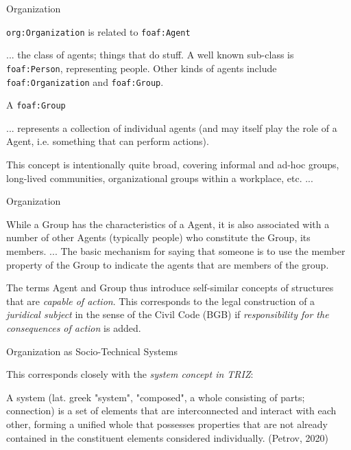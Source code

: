 \documentclass{beamer}
\begin{document}
\begin{frame}{Organization}

  \texttt{org:Organization} is related to \texttt{foaf:Agent}

  ... the class of agents; things that do stuff. A well known sub-class is
  \texttt{foaf:Person}, representing people. Other kinds of agents include
  \texttt{foaf:Organization} and \texttt{foaf:Group}. 

  A \texttt{foaf:Group}

  ... represents a collection of individual agents (and may itself play the
  role of a Agent, i.e. something that can perform actions).

  This concept is intentionally quite broad, covering informal and ad-hoc
  groups, long-lived communities, organizational groups within a workplace,
  etc. ...
\end{frame}

\begin{frame}{Organization}

  While a Group has the characteristics of a Agent, it is also associated with
  a number of other Agents (typically people) who constitute the Group, its
  members. ...  The basic mechanism for saying that someone is to use the
  member property of the Group to indicate the agents that are members of the
  group.
  
  The terms Agent and Group thus introduce self-similar concepts of structures
  that are \emph{capable of action}. This corresponds to the legal
  construction of a \emph{juridical subject} in the sense of the Civil Code
  (BGB) if \emph{responsibility for the consequences of action} is added.

\end{frame}

\begin{frame}{Organization as Socio-Technical Systems}

This corresponds closely with the \emph{system concept in TRIZ}:

  A system (lat. greek "system", "composed", a whole consisting of parts;
  connection) is a set of elements that are interconnected and interact with
  each other, forming a unified whole that possesses properties that are not
  already contained in the constituent elements considered individually.
  (Petrov, 2020)
  
\end{frame}
\end{document}
